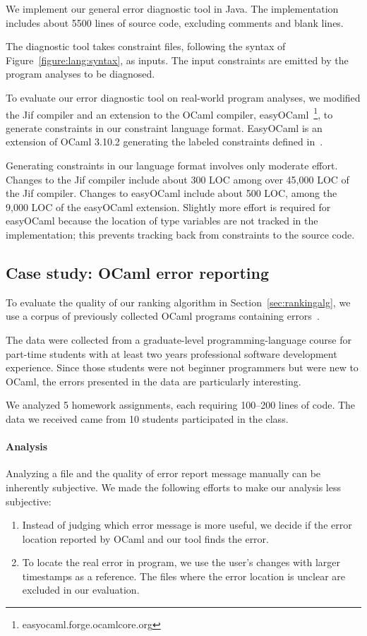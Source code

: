 We implement our general error diagnostic tool in Java. The
implementation includes about 5500 lines of source code, excluding
comments and blank lines.

The diagnostic tool takes constraint files, following the syntax of
Figure~\ref{figure:lang:syntax}, as inputs. The input constraints are
emitted by the program analyses to be diagnosed.

To evaluate our error diagnostic tool on real-world program analyses,
we modified the Jif compiler and an extension to the OCaml compiler,
easyOCaml~\footnote{easyocaml.forge.ocamlcore.org}, to generate
constraints in our constraint language format. EasyOCaml is an
extension of OCaml 3.10.2 generating the labeled constraints defined
in~\cite{haack:slicing}.

Generating constraints in our language format involves only moderate
effort. Changes to the Jif compiler include about 300 LOC among
over 45,000 LOC of the Jif compiler. Changes to easyOCaml include about
500 LOC, among the 9,000 LOC of the easyOCaml extension.  Slightly more
effort is required for easyOCaml because the location of type
variables are not tracked in the implementation; this prevents
tracking back from constraints to the source code.

\subsection{Case study: OCaml error reporting}
\label{sec:ocamleval}

To evaluate the quality of our ranking algorithm in
Section~\ref{sec:rankingalg}, we use a corpus of previously collected
OCaml programs containing errors~\cite{lerner:pldi07}.

The data were collected from a graduate-level programming-language
course for part-time students with at least two years professional
software development experience. Since those students were not
beginner programmers but were new to OCaml, the errors presented in
the data are particularly interesting.

We analyzed 5 homework assignments, each requiring 100--200 lines of
code. The data we received came from 10 students participated in the
class.

\paragraph{Analysis}

Analyzing a file and the quality of error report message manually can
be inherently subjective. We made the following efforts to make our
analysis less subjective:
\begin{enumerate}
\item Instead of judging which error message is more useful, we decide
if the error location reported by OCaml and our tool finds the error.

\item To locate the real error in program, we use the user's changes
with larger timestamps as a reference. The files where the error
location is unclear are excluded in our evaluation.
\end{enumerate}

